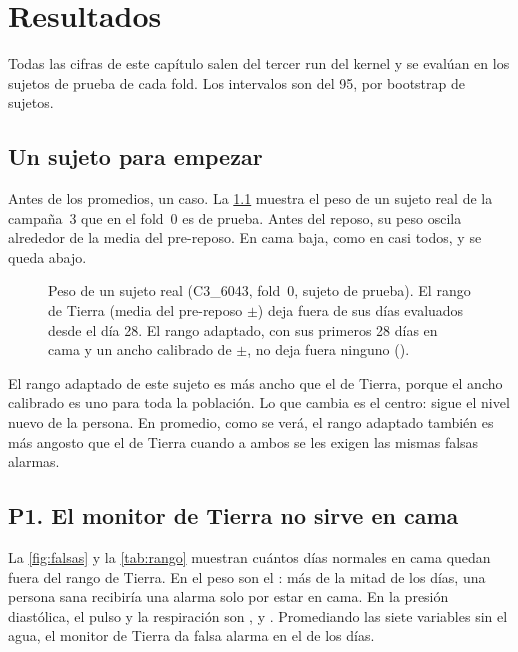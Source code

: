 \chapter{Resultados}\label{cap:resultados}

Todas las cifras de este capítulo salen del tercer run del kernel y se evalúan en los sujetos de prueba de cada fold.
Los intervalos son del 95\pct{}, por bootstrap de sujetos.

\section{Un sujeto para empezar}

Antes de los promedios, un caso. La \cref{fig:ilustracion} muestra el peso de un sujeto real de la campaña~3 que en el
fold~0 es de prueba. Antes del reposo, su peso oscila alrededor de la media del pre-reposo. En cama baja, como en casi
todos, y se queda abajo.

\begin{figure}[htbp]

\caption[Un sujeto real: rango de Tierra y rango adaptado]{Peso de un sujeto real (C3\_6043, fold~0, sujeto de
prueba). El rango de Tierra (media del pre-reposo $\pm$) deja fuera
 de sus  días evaluados desde el día 28. El rango adaptado, con sus
primeros 28 días en cama y un ancho calibrado de $\pm$, no deja fuera ninguno
().}
\label{fig:ilustracion}
\end{figure}

El rango adaptado de este sujeto es más ancho que el de Tierra, porque el ancho calibrado es uno para toda la
población. Lo que cambia es el centro: sigue el nivel nuevo de la persona. En promedio, como se verá, el rango
adaptado también es más angosto que el de Tierra cuando a ambos se les exigen las mismas falsas alarmas.

\section{P1. El monitor de Tierra no sirve en cama}\label{sec:res-p1}

La \cref{fig:falsas} y la \cref{tab:rango} muestran cuántos días normales en cama quedan fuera del rango de Tierra. En el
peso son el \pct{} : más de la mitad de los días, una persona sana recibiría una
alarma solo por estar en cama. En la presión diastólica, el pulso y la respiración son
,  y \pct. Promediando las siete variables sin
el agua, el monitor de Tierra da falsa alarma en el \pct{} de los días.

